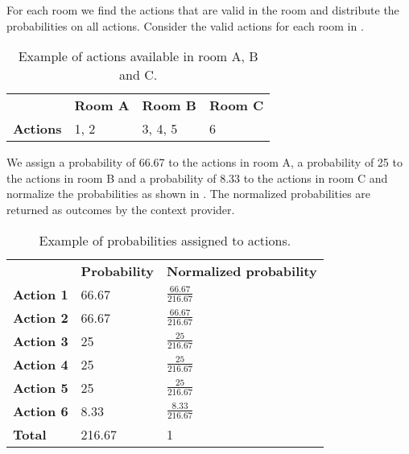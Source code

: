 For each room we find the actions that are valid in the room and distribute the probabilities on all actions. Consider the valid actions for each room in .

\begin{table}[h!]
\centering
\caption{Example of actions available in room A, B and C.}
\label{tbl:sec:design:position-context-provider:actions}
\begin{tabular}{llll}
                 & \textbf{Room A} & \textbf{Room B} & \textbf{Room C} \\
\textbf{Actions} & 1, 2            & 3, 4, 5         & 6   
\end{tabular}
\end{table}

We assign a probability of 66.67 to the actions in room A, a probability of 25 to the actions in room B and a probability of 8.33 to the actions in room C and normalize the probabilities as shown in . The normalized probabilities are returned as outcomes by the context provider.

\begin{table}[h!]
\centering
\caption{Example of probabilities assigned to actions.}
\label{tbl:sec:design:position-context-provider:weighted-actions}
\begin{tabular}{lll}
                  & \textbf{Probability} & \textbf{Normalized probability} \\
\textbf{Action 1} & 66.67              & $\frac{66.67}{216.67}$                   \\
\textbf{Action 2} & 66.67              & $\frac{66.67}{216.67}$                   \\
\textbf{Action 3} & 25              & $\frac{25}{216.67}$                   \\
\textbf{Action 4} & 25              & $\frac{25}{216.67}$                   \\
\textbf{Action 5} & 25              & $\frac{25}{216.67}$                   \\
\textbf{Action 6} & 8.33               & $\frac{8.33}{216.67}$                    \\
\textbf{Total}    & 216.67             & 1                         
\end{tabular}
\end{table}

